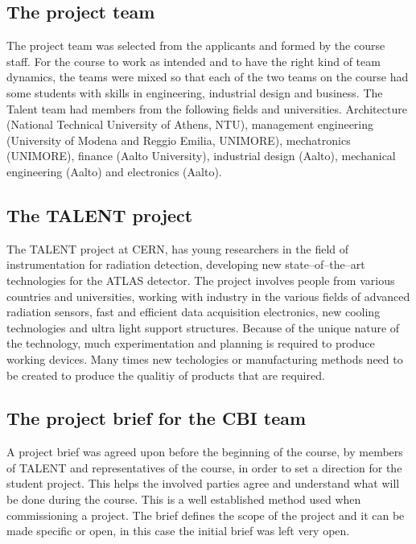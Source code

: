 \documentclass[english,12pt,a4paper,pdftex]{article}
\begin{document}
\subsection{The project team}

The project team was selected from the applicants and formed by the course staff. For the course to work as intended and to have the right kind of team dynamics, the teams were mixed so that each of the two teams on the course had some students with skills in engineering, industrial design and business. The Talent team had members from the following fields and universities. Architecture (National Technical University of Athens, NTU), management engineering (University of Modena and Reggio Emilia, UNIMORE), mechatronics (UNIMORE), finance (Aalto University), industrial design (Aalto), mechanical engineering (Aalto) and electronics (Aalto).


\subsection{The TALENT project}

The TALENT project at CERN, has young researchers in the field of instrumentation for radiation detection, developing new state--of--the--art technologies for the ATLAS detector. The project involves people from various countries and universities, working with industry in the various fields of advanced radiation sensors, fast and efficient data acquisition electronics, new cooling technologies and ultra light support structures. Because of the unique nature of the technology, much experimentation and planning is required to produce working devices. Many times new techologies or manufacturing methods need to be created to produce the qualitiy of products that are required.


\subsection{The project brief for the CBI team}

A project brief was agreed upon before the beginning of the course, by members of TALENT and representatives of the course, in order to set a direction for the student project. This helps the involved parties agree and understand what will be done during the course. This is a well established method used when commissioning a project. The brief defines the scope of the project and it can be made specific or open, in this case the initial brief was left very open.
\end{document}
